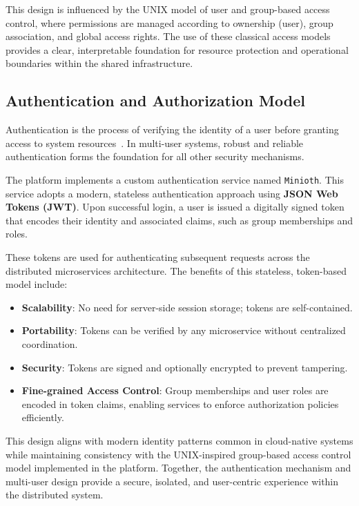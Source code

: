 This design is influenced by the UNIX model of user and group-based access control, where permissions are managed according to ownership (user), group association, and global access rights. The use of these classical access models provides a clear, interpretable foundation for resource protection and operational boundaries within the shared infrastructure.

\subsection{Authentication and Authorization Model}

Authentication is the process of verifying the identity of a user before granting access to system resources~\cite{ferraiolo-auth}. In multi-user systems, robust and reliable authentication forms the foundation for all other security mechanisms.

The platform implements a custom authentication service named \texttt{Minioth}. This service adopts a modern, stateless authentication approach using \textbf{JSON Web Tokens (JWT)}. Upon successful login, a user is issued a digitally signed token that encodes their identity and associated claims, such as group memberships and roles.

These tokens are used for authenticating subsequent requests across the distributed microservices architecture. The benefits of this stateless, token-based model include:
\begin{itemize}
    \item \textbf{Scalability}: No need for server-side session storage; tokens are self-contained.
    \item \textbf{Portability}: Tokens can be verified by any microservice without centralized coordination.
    \item \textbf{Security}: Tokens are signed and optionally encrypted to prevent tampering.
    \item \textbf{Fine-grained Access Control}: Group memberships and user roles are encoded in token claims, enabling services to enforce authorization policies efficiently.
\end{itemize}

This design aligns with modern identity patterns common in cloud-native systems while maintaining consistency with the UNIX-inspired group-based access control model implemented in the platform. Together, the authentication mechanism and multi-user design provide a secure, isolated, and user-centric experience within the distributed system.

